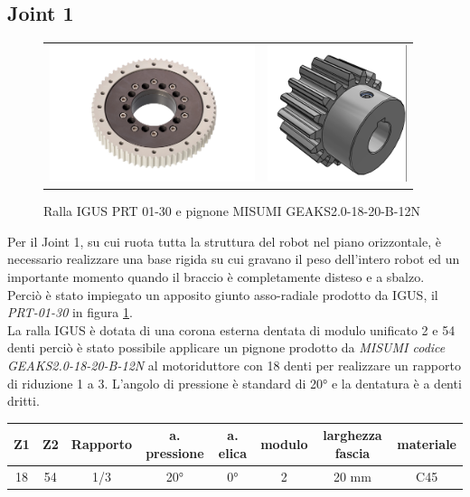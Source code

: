 \documentclass[%
corpo=11pt,
twoside,
 stile=classica,
oldstyle,
greek,%
]{toptesi}
\begin{document}
		\subsection{Joint 1}
		\begin{figure}
			\centering
			\begin{tabular}{ll}
				\includegraphics[height=4cm,keepaspectratio]{pictures/ralla.jpg}
				&
				\includegraphics[height=4cm,keepaspectratio]{pictures/pignone.png}
			\end{tabular}
			\caption{Ralla IGUS PRT 01-30 e pignone MISUMI GEAKS2.0-18-20-B-12N}
			\label{fig:RALLA}
		\end{figure}
		Per il Joint 1, su cui ruota tutta la struttura del robot nel piano orizzontale, è necessario realizzare una base rigida su cui gravano il peso dell'intero robot ed un importante momento quando il braccio è completamente disteso e a sbalzo.\\
		 Perciò è stato impiegato un apposito giunto asso-radiale prodotto da IGUS, il \textit{PRT-01-30} in figura \ref{fig:RALLA}. \\
		La ralla IGUS è dotata di una corona esterna dentata di modulo unificato 2 e 54 denti perciò è stato possibile applicare un pignone prodotto da \textit{MISUMI codice GEAKS2.0-18-20-B-12N} al motoriduttore con 18 denti per realizzare un rapporto di riduzione 1 a 3. L'angolo di pressione è standard di 20° e la dentatura è a denti dritti. 
		\\
		\begin{tabular}{|c|c|c|c|c|c|c|c|}
			
			\hline
			Z1 & Z2 & Rapporto & a. pressione & a. elica & modulo & larghezza fascia & materiale \\
			\hline
			18 & 54 & 1/3 & 20° & 0°  & 2 & 20 mm & C45  \\
			\hline
			
		\end{tabular}
\end{document}
